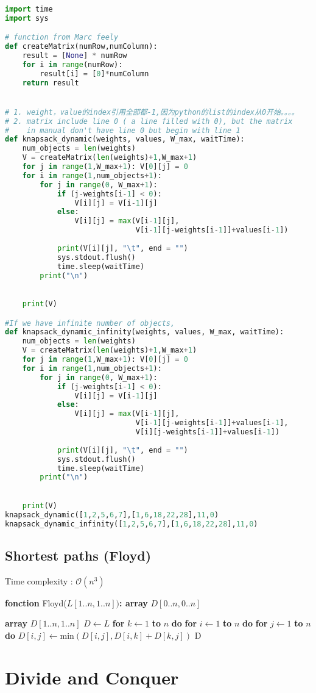 \documentclass{article}
\theoremstyle{definition}
\theoremstyle{remark}
\begin{document}
\begin{lstlisting}[language = Python, caption = codes pour knapsack2]
	
import time
import sys

# function from Marc feely
def createMatrix(numRow,numColumn):
    result = [None] * numRow
    for i in range(numRow):
        result[i] = [0]*numColumn
    return result


# 1. weight，value的index引用全部都-1,因为python的list的index从0开始。。。。
# 2. matrix include line 0 ( a line filled with 0), but the matrix
#    in manual don't have line 0 but begin with line 1
def knapsack_dynamic(weights, values, W_max, waitTime):
    num_objects = len(weights)
    V = createMatrix(len(weights)+1,W_max+1) 
    for j in range(1,W_max+1): V[0][j] = 0
    for i in range(1,num_objects+1):
        for j in range(0, W_max+1):
            if (j-weights[i-1] < 0): 
                V[i][j] = V[i-1][j]
            else: 
                V[i][j] = max(V[i-1][j],
                              V[i-1][j-weights[i-1]]+values[i-1])
            
            print(V[i][j], "\t", end = "")
            sys.stdout.flush()
            time.sleep(waitTime)
        print("\n")

            
    print(V)

#If we have infinite number of objects,
def knapsack_dynamic_infinity(weights, values, W_max, waitTime):
    num_objects = len(weights)
    V = createMatrix(len(weights)+1,W_max+1) 
    for j in range(1,W_max+1): V[0][j] = 0
    for i in range(1,num_objects+1):
        for j in range(0, W_max+1):
            if (j-weights[i-1] < 0): 
                V[i][j] = V[i-1][j]
            else: 
                V[i][j] = max(V[i-1][j],
                              V[i-1][j-weights[i-1]]+values[i-1],
                              V[i][j-weights[i-1]]+values[i-1])
            
            print(V[i][j], "\t", end = "")
            sys.stdout.flush()
            time.sleep(waitTime)
        print("\n")

            
    print(V)
knapsack_dynamic([1,2,5,6,7],[1,6,18,22,28],11,0)
knapsack_dynamic_infinity([1,2,5,6,7],[1,6,18,22,28],11,0)
\end{lstlisting}
\subsection{Shortest paths (Floyd)}
Time complexity : $\mathcal{O} \left ( n^{3} \right ) $
    \begin{algorithm} 
	\caption{\textbf{fonction} Floyd($L[1..n, 1..n])$\textbf{: array} $D[0..n, 0..n]$
}
	\label{Floyd_algo} 
	\begin{algorithmic}
	\STATE \textbf{array} $D[1..n,1..n]$	
	\STATE $D \gets L$
	\STATE \textbf{for} $k \gets 1$ \textbf{to} $n$ \textbf{do}
	\STATE \qquad\textbf{for} $i \gets 1$ \textbf{to} $n$ \textbf{do}
	\STATE \qquad\qquad\textbf{for} $j \gets 1 $\textbf{ to} $n$ \textbf{do}
	\STATE \qquad\qquad\qquad$D[i,j] \gets \text{min}\left( D[i,j], D[i,k]+D[k,j] \right) $
	\RETURN D
	
	\end{algorithmic} 
    \end{algorithm}

\section{Divide and Conquer}



    
\end{document}
